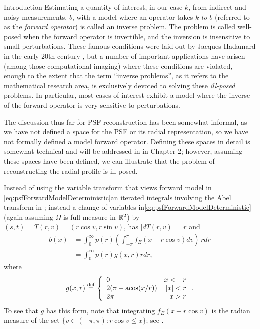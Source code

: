 \begin{chapter}{Introduction}
  Estimating a quantity of interest, in our case $k$, from indirect and noisy measurements, $b$, with a model where an operator takes $k$ \emph{to} $b$ (referred to as the \emph{forward operator}) is called an inverse problem.  
  The problem is called well-posed when the forward operator is invertible, and the inversion is insensitive to small perturbations.
  These famous conditions were laid out by Jacques Hadamard in the early 20th century \citep{hadamard1902}, but a number of important applications have arisen (among those computational imaging) where these conditions are violated, enough to the extent that the term ``inverse problems'', as it refers to the mathematical research area, is exclusively devoted to solving these \emph{ill-posed} problems.
  In particular, most cases of interest %
  exhibit a model where the inverse of the forward operator is very sensitive to perturbations.

  The discussion thus far for PSF reconstruction has been somewhat informal, as we have not defined a space for the PSF or its radial representation, so we have not formally defined a model forward operator.
  Defining these spaces in detail is somewhat technical and will be addressed in in Chapter 2; however, assuming these spaces have been defined, we can illustrate that the problem of reconstructing the radial profile is ill-posed.

  Instead of using the variable transform that views forward model in \eqref{eq:psfForwardModelDeterministic}an iterated integrals involving the Abel transform in \label{eq:abelForward}; instead 
  a change of variables in\eqref{eq:psfForwardModelDeterministic} (again assuming $\Omega$ is full measure in $\mathbb R^2$)  by $(s,t) = T(r,v) = (r\cos v,r\sin v)$, has $|dT(r,v)| = r$ and 
  \begin{align}
    b(x) &= \int_0^\infty p(r) \left( \int_{-\pi}^\pi f_E(x - r\cos v)dv \right)\,r dr\nonumber \\
         &= \int_0^\infty p(r) g(x,r) r dr, \label{eq:radialForwardModelDeterministic}
  \end{align}
where
\begin{equation} \label{eq:radialForwardKernel}
  g(x,r) \stackrel{\rm def}{=} \left\{\begin{array}{lr}
    0 & x < - r\\
    2(\pi - \operatorname*{acos}(x/r)) & |x| < r\\
    2\pi &  x> r
  \end{array}\right..  
\end{equation}
  To see that $g$ has this form, note that integrating $f_E(x-r\cos v)$ is the radian measure of the set $\{v\in(-\pi,\pi): r\cos v \le x\}$; see .  


\end{chapter}
